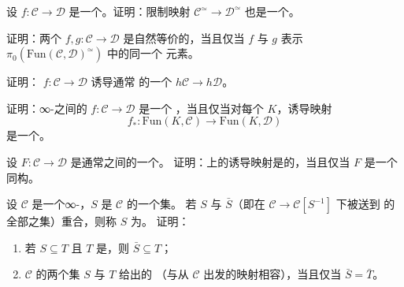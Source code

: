 \begin{exercise}\label{ex:joyal-equivalence-core}
设 $f\colon \mathcal{C} \to \mathcal{D}$ 是一个\trJoyalEquivalence{}。证明：限制映射
$\mathcal{C}^{\simeq} \to \mathcal{D}^{\simeq}$ 也是一个\trJoyalEquivalence{}。
\end{exercise}

\begin{exercise}\label{ex:naturally-equivalent-functors}
证明：两个\trFunctor{} $f, g\colon \mathcal{C} \to \mathcal{D}$ 是自然等价的，当且仅当
$f$ 与 $g$ 表示 $\pi_0(\mathrm{Fun}(\mathcal{C}, \mathcal{D})^{\simeq})$ 中的同一个
元素。
\end{exercise}

\begin{exercise}\label{ex:joyal-equivalence-h}
证明：\trJoyalEquivalence{} $f\colon \mathcal{C} \to \mathcal{D}$ 诱导通常%
\trCategories{}的一个\trEquivalence{} $h\mathcal{C} \to h\mathcal{D}$。
\end{exercise}

\begin{exercise}\label{ex:joyal-equivalence-fun}
证明：∞-\trCategories{}之间的\trFunctor{} $f\colon \mathcal{C} \to \mathcal{D}$ 是一个%
\trJoyalEquivalence{}，当且仅当对每个\trSimplicialSet{} $K$，诱导映射
\[
f_{*}\colon \mathrm{Fun}(K, \mathcal{C}) \to \mathrm{Fun}(K, \mathcal{D})
\]
是一个\trJoyalEquivalence{}。
\end{exercise}

\begin{exercise}\label{ex:nerve-inner-anodyne-iso}
设 $F\colon \mathcal{C} \to \mathcal{D}$ 是通常\trCategories{}之间的一个\trFunctor{}。
证明：\trNerve{}上的诱导映射是\trInnerAnodyne{}的，当且仅当 $F$ 是一个同构。
\end{exercise}

\begin{exercise}\label{ex:saturated-localization}
设 $\mathcal{C}$ 是一个∞-\trCategory{}，$S$ 是 $\mathcal{C}$ 的一个\trMorphism{}集。
若 $S$ 与 $\bar{S}$（即在\trFunctor{} $\mathcal{C} \to \mathcal{C}[S^{-1}]$ 下被送到%
\trEquivalence{}的全部\trMorphism{}之集）重合，则称 $S$ 为\emph{\trSaturated{}}。
证明：
\begin{enumerate}[label=(\arabic*)]
  \item 若 $S \subseteq T$ 且 $T$ 是\trSaturated{}，则 $\bar{S} \subseteq T$；
  \item $\mathcal{C}$ 的两个\trMorphism{}集 $S$ 与 $T$ 给出\trJoyalEquivalence{}的%
        \trLocalization{}（与从 $\mathcal{C}$ 出发的映射相容），当且仅当
        $\bar{S} = \bar{T}$。
\end{enumerate}
\end{exercise}

